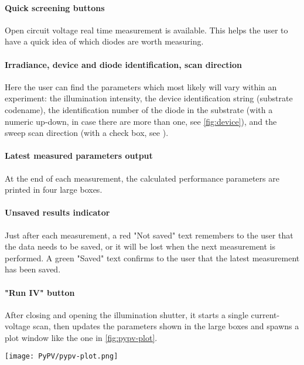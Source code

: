 \paragraph{Quick screening buttons}
Open circuit voltage real time measurement is available.
This helps the user to have a quick idea of which diodes are worth measuring.

\paragraph{Irradiance, device and diode identification, scan direction}
Here the user can find the parameters which most likely will vary within an experiment: the illumination intensity, the device identification string (substrate codename), the identification number of the diode in the substrate (with a numeric up-down, in case there are more than one, see \cref{fig:device}), and the sweep scan direction (with a check box, see ).

\paragraph{Latest measured parameters output}
At the end of each measurement, the calculated performance parameters are printed in four large boxes.

\paragraph{Unsaved results indicator}
Just after each measurement, a red "Not saved" text remembers to the user that the data needs to be saved, or it will be lost when the next measurement is performed.
A green "Saved" text confirms to the user that the latest measurement has been saved.

\paragraph{"Run IV" button}
After closing and opening the illumination shutter, it starts a single current\hyp{}voltage scan, then updates the parameters shown in the large boxes and spawns a plot window like the one in \cref{fig:pypv-plot}.

\begin{SCfigure}
	\centering
	\texttt{[image: PyPV/pypv-plot.png]}
	\label{fig:pypv-plot}
\end{SCfigure}

